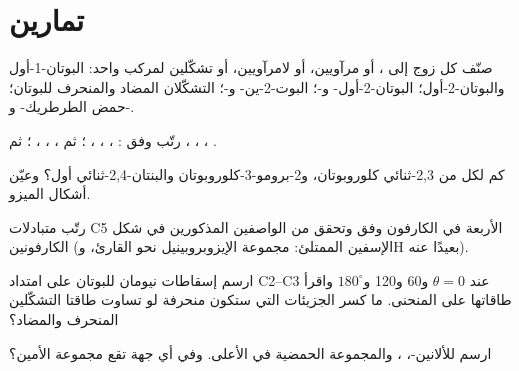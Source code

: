 \section{تمارين}

\begin{exercise}[$\star$]\label{exo:b1:stereochemistry-in-depth:1}
صنّف كل زوج إلى ، أو مرآويين، أو لامرآويين،
أو تشكّلين لمركب واحد: البوتان-1-أول والبوتان-2-أول؛
البوتان-2-أول- و-؛ البوت-2-ين- و-؛ التشكّلان المضاد
والمنحرف للبوتان؛ حمض الطرطريك- و-.
\end{exercise}

\begin{exercise}[$\star$]\label{exo:b1:stereochemistry-in-depth:2}
رتّب وفق : ، ، ، ؛ ثم
، ، ، ؛ ثم ،
، ، .
\end{exercise}

\begin{exercise}[$\star$]\label{exo:b1:stereochemistry-in-depth:3}
كم  لكل من 2,3-ثنائي كلوروبوتان، و2-برومو-3-كلوروبوتان
والبنتان-2,4-ثنائي أول؟ وعيّن أشكال الميزو.
\end{exercise}

\begin{exercise}[$\star$]\label{exo:b1:stereochemistry-in-depth:4}
رتّب متبادلات C5 الأربعة في الكارفون وفق  وتحقق من
الواصفين المذكورين في شكل الكارفونين (الإسفين الممتلئ:
مجموعة الإيزوبروبينيل نحو القارئ، وH بعيدًا عنه).
\end{exercise}

\begin{exercise}[$\star\star$]\label{exo:b1:stereochemistry-in-depth:5}
ارسم إسقاطات نيومان للبوتان على امتداد C2--C3 عند $\theta = 0$ و60
و120 و$180^\circ$ واقرأ طاقاتها على المنحنى. ما كسر
الجزيئات التي ستكون منحرفة لو تساوت طاقتا التشكّلين المنحرف والمضاد؟
\end{exercise}

\begin{exercise}[$\star\star$]\label{exo:b1:stereochemistry-in-depth:6}
ارسم  للألانين-،
، والمجموعة الحمضية في الأعلى. وفي أي جهة
تقع مجموعة الأمين؟
\end{exercise}

